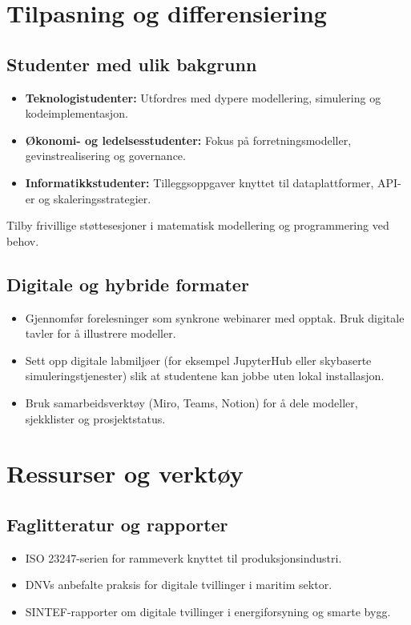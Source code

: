 \section{Tilpasning og differensiering}
\subsection{Studenter med ulik bakgrunn}
\begin{itemize}
    \item \textbf{Teknologistudenter:} Utfordres med dypere modellering, simulering og kodeimplementasjon.
    \item \textbf{Økonomi- og ledelsesstudenter:} Fokus på forretningsmodeller, gevinstrealisering og governance.
    \item \textbf{Informatikkstudenter:} Tilleggsoppgaver knyttet til dataplattformer, API-er og skaleringsstrategier.
\end{itemize}
Tilby frivillige støttesesjoner i matematisk modellering og programmering ved behov.

\subsection{Digitale og hybride formater}
\begin{itemize}
    \item Gjennomfør forelesninger som synkrone webinarer med opptak. Bruk digitale tavler for å illustrere modeller.
    \item Sett opp digitale labmiljøer (for eksempel JupyterHub eller skybaserte simuleringstjenester) slik at studentene kan jobbe uten lokal installasjon.
    \item Bruk samarbeidsverktøy (Miro, Teams, Notion) for å dele modeller, sjekklister og prosjektstatus.
\end{itemize}

\section{Ressurser og verktøy}
\subsection{Faglitteratur og rapporter}
\begin{itemize}
    \item ISO 23247-serien for rammeverk knyttet til produksjonsindustri.
    \item DNVs anbefalte praksis for digitale tvillinger i maritim sektor.
    \item SINTEF-rapporter om digitale tvillinger i energiforsyning og smarte bygg.
\end{itemize}

